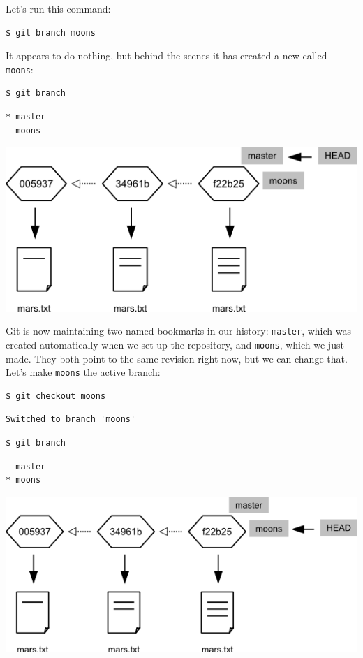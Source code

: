 \documentclass{book}
\begin{document}
Let's run this command:

\begin{verbatim}
$ git branch moons
\end{verbatim}

It appears to do nothing, but behind the scenes it has created a new
 called \texttt{moons}:

\begin{verbatim}
$ git branch
\end{verbatim}

\begin{verbatim}
* master
  moons
\end{verbatim}

\includegraphics{novice/extras/img/git-branching-02.png}

Git is now maintaining two named bookmarks in our history:
\texttt{master}, which was created automatically when we set up the
repository, and \texttt{moons}, which we just made. They both point to
the same revision right now, but we can change that. Let's make
\texttt{moons} the active branch:

\begin{verbatim}
$ git checkout moons
\end{verbatim}

\begin{verbatim}
Switched to branch 'moons'
\end{verbatim}

\begin{verbatim}
$ git branch
\end{verbatim}

\begin{verbatim}
  master
* moons
\end{verbatim}

\includegraphics{novice/extras/img/git-branching-03.png}
\end{document}
